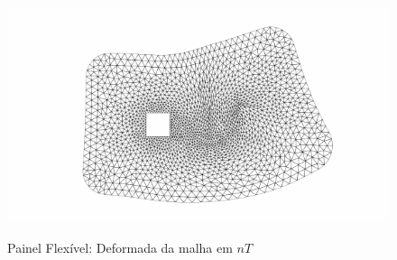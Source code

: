 \begin{figure}[!htbp]
	\label{fig:prism_campos_press}
\end{figure}

\begin{figure}[!htbp]
	\caption{Painel Flexível: Deformada da malha em $nT$}
	\centering 
	\includegraphics[scale=1.0,trim=1cm 0.2cm 1cm 0.2cm, clip=true]{Imagens/Cap7/prism_malha_def.pdf}	
	\label{fig:prisma_defor_malha}
\end{figure}
